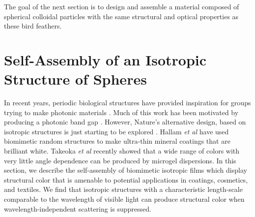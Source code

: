 The goal of the next section is to design and assemble a material composed of spherical colloidal particles with the same structural and optical properties as these bird feathers.


\section{Self-Assembly of an Isotropic Structure of Spheres}

In recent years, periodic biological structures have provided inspiration for groups trying to make photonic materials \cite{Parker:2004p11036, Parker:2007p11434}. 
Much of this work has been motivated by producing a photonic band gap \cite{Yablonovitch:1987p1809, Joannopoulos:2008p11516, Noda:2003p11561, MSoukoulis:2001p11651, Kinoshita:2008p10935, Muller:2000p5865}. 
However, Nature's alternative design, based on isotropic structures is just starting to be explored \cite{Hallam:2009p11443, Takeoka:2009p10174, Saranathan:2011}. 
Hallam \emph{et al} have used biomimetic random structures to make ultra-thin mineral coatings that are brilliant white.
Takeoka \emph{et al} recently showed  that a wide range of colors with very little angle dependence can be produced by microgel dispersions.
In this section, we describe the self-assembly of biomimetic isotropic films which display structural color that is amenable to  potential applications in coatings, cosmetics, and textiles.
We find that isotropic structures with a characteristic length-scale comparable to the wavelength of visible light can produce structural color when wavelength-independent scattering is suppressed.


